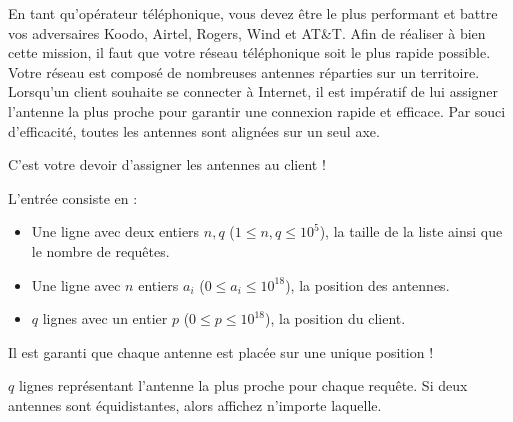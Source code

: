 \problemname{\problemyamlname{}}


En tant qu'opérateur téléphonique, vous devez être le plus performant et battre vos adversaires Koodo, Airtel, Rogers, Wind et AT\&T. Afin de réaliser à bien cette mission, il faut que votre réseau téléphonique soit le plus rapide possible. Votre réseau est composé de nombreuses antennes réparties sur un territoire. Lorsqu'un client souhaite se connecter à Internet, il est impératif de lui assigner l'antenne la plus proche pour garantir une connexion rapide et efficace. Par souci d'efficacité, toutes les antennes sont alignées sur un seul axe.

C'est votre devoir d'assigner les antennes au client !

\begin{Input}
    L'entrée consiste en :
    \begin{itemize}
        \item Une ligne avec deux entiers $n, q$ ($1 \leq n, q \leq 10^5$), la taille de la liste ainsi que le nombre de requêtes.
        \item Une ligne avec $n$ entiers $a_i$ ($0 \leq a_i \leq 10^{18}$), la position des antennes.
        \item $q$ lignes avec un entier $p$ ($0 \leq p \leq 10^{18}$), la position du client.
    \end{itemize}
    Il est garanti que chaque antenne est placée sur une unique position !
\end{Input}

\begin{Output}
    $q$ lignes représentant l'antenne la plus proche pour chaque requête. Si deux antennes sont équidistantes, alors affichez n'importe laquelle.
\end{Output}
